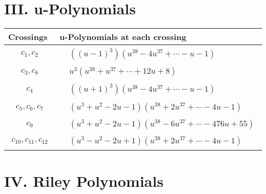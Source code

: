 \documentclass[1p]{elsarticle_modified}
\theoremstyle{definition}
\begin{document}
\newpage\renewcommand{\arraystretch}{1}
\centering \section*{ III. u-Polynomials}
\begin{tabular}{m{50pt}|m{274pt}}
Crossings & \hspace{64pt}u-Polynomials at each crossing \\
\hline $$\begin{aligned}c_{1},c_{2}\end{aligned}$$&$\begin{aligned}
&((u-1)^3)(u^{38}-4 u^{37}+\cdots- u-1)
\end{aligned}$\\
\hline $$\begin{aligned}c_{3},c_{8}\end{aligned}$$&$\begin{aligned}
&u^3(u^{38}+u^{37}+\cdots+12 u+8)
\end{aligned}$\\
\hline $$\begin{aligned}c_{4}\end{aligned}$$&$\begin{aligned}
&((u+1)^3)(u^{38}-4 u^{37}+\cdots- u-1)
\end{aligned}$\\
\hline $$\begin{aligned}c_{5},c_{6},c_{7}\end{aligned}$$&$\begin{aligned}
&(u^3+u^2-2 u-1)(u^{38}+2 u^{37}+\cdots-4 u-1)
\end{aligned}$\\
\hline $$\begin{aligned}c_{9}\end{aligned}$$&$\begin{aligned}
&(u^3+u^2-2 u-1)(u^{38}-6 u^{37}+\cdots-476 u+55)
\end{aligned}$\\
\hline $$\begin{aligned}c_{10},c_{11},c_{12}\end{aligned}$$&$\begin{aligned}
&(u^3- u^2-2 u+1)(u^{38}+2 u^{37}+\cdots-4 u-1)
\end{aligned}$\\
\hline
\end{tabular}\newpage\renewcommand{\arraystretch}{1}
\centering \section*{ IV. Riley Polynomials}
\end{document}
